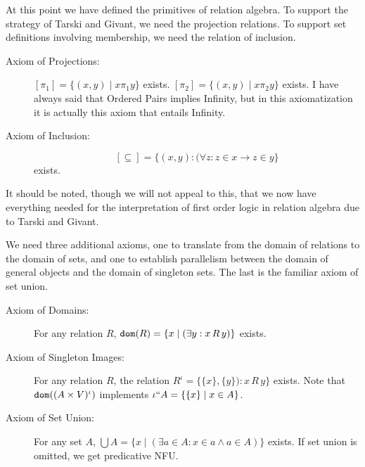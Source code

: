 \documentclass{slides}
\begin{document}
\begin{slide}

At this point we have defined the primitives of relation algebra.  To support the strategy of Tarski and
Givant, we need the projection relations.  To support set definitions involving membership, we need the relation of inclusion. 

\begin{description}

\item[Axiom of Projections:]  $[\pi_1]=\{(x,y)\mid x \pi_1 y\}$ exists.   $[\pi_2]=\{(x,y)\mid x \pi_2y\}$ exists.  I have always said that Ordered Pairs implies Infinity, but in this axiomatization it is actually this axiom that entails Infinity.

\item[Axiom of Inclusion:]  $$[\subseteq] = \{(x,y):(\forall z:z \in x \rightarrow z \in y\}$$ exists.

\end{description}

It should be noted, though we will not appeal to this, that we now have everything needed for the interpretation
of first order logic in relation algebra due to Tarski and Givant.

\end{slide}

\begin{slide}

We need three additional axioms, one to translate from the domain of relations to the domain of sets,
and one to establish parallelism between the domain of general objects and the domain of singleton sets.  The last is the familiar axiom of set union.

\begin{description}

\item[Axiom of Domains:]  For any relation $R$, ${\tt dom}(R) = \{x\mid (\exists y:x \,R\,y)\}$ exists.

\item[Axiom of Singleton Images:]  For any relation $R$, the relation $R^\iota = \{\{x\},\{y\}):x\,R\,y\}$ exists.  Note that ${\tt dom}((A \times V)^{\iota})$ implements $\iota``A = \{\{x\}\mid x \in A\}$.

\item[Axiom of Set Union:]  For any set $A$, $\bigcup A = \{x\mid(\exists a \in A:x \in a \wedge a \in A)\}$ exists.  If set union is omitted, we get predicative NFU.

\end{description}

\end{slide}
\end{document}
